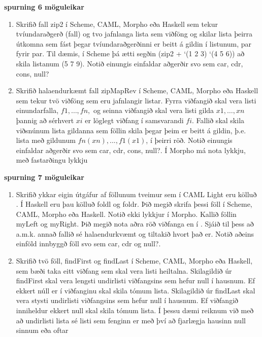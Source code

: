 \documentclass{article}
\newcommand{\bo}[1]{\textbf{#1}}
\begin{document}
\bo{spurning 6  möguleikar}
\begin{enumerate}
    \item Skrifið fall zip2 í Scheme, CAML, Morpho eða Haskell sem tekur
    tvíundaraðgerð (fall) og tvo jafnlanga lista sem viðföng og skilar
    lista þeirra útkomna sem fást þegar tvíundaraðgerðinni er beitt á
    gildin í listunum, par fyrir par. Til dæmis, í Scheme þá ætti
    segðin (zip2 + ‘(1 2 3) ‘(4 5 6)) að skila listanum (5 7 9). Notið
    einungis einfaldar aðgerðir svo sem car, cdr, cons, null?

    \item Skrifið halaendurkæmt fall zipMapRev í Scheme, CAML,
    Morpho eða Haskell sem tekur tvö viðföng sem eru jafnlangir
    listar. Fyrra viðfangið skal vera listi einundarfalla, $f1, \ldots , fn,$ og
    seinna viðfangið skal vera listi gilda $x1, \ldots , xn$ þannig að sérhvert
    $xi$ er löglegt viðfang í samsvarandi $fi$. Fallið skal skila
    viðsnúnum lista gildanna sem föllin skila þegar þeim er beitt á
    gildin, þ.e. lista með gildunum $fn(xn), ... , f1(x1)$, í þeirri röð. Notið
    einungis einfaldar aðgerðir svo sem car, cdr, cons, null?. Í
    Morpho má nota lykkju, með fastarðingu lykkju
\end{enumerate}

\bo{spurning 7 möguleikar}
\begin{enumerate}
    \item Skrifið ykkar eigin útgáfur af föllunum tveimur sem í CAML Light
    eru kölluð . Í Haskell eru þau kölluð foldl og foldr. Þið
    megið skrifa þessi föll í Scheme, CAML, Morpho eða Haskell. Notið
    ekki lykkjur í Morpho. Kallið föllin myLeft og myRight. Þið megið
    nota aðra röð viðfanga en í . Sjáið til þess að a.m.k.
    annað fallið sé halaendurkvæmt og tiltakið hvort það er. Notið
    aðeins einföld innbyggð föll svo sem car, cdr og null?.

    \item Skrifið tvö föll, findFirst og findLast í Scheme, CAML, Morpho
    eða Haskell, sem bæði taka eitt viðfang sem skal vera listi
    heiltalna. Skilagildið úr findFirst skal vera lengsti undirlisti
    viðfangsins sem hefur null í hausnum. Ef ekkert núll er í
    viðfanginu skal skila tómum lista. Skilagildið úr findLast skal
    vera stysti undirlisti viðfangsins sem hefur null í hausnum. Ef
    viðfangið inniheldur ekkert null skal skila tómum lista. Í þessu
    dæmi reiknum við með að undirlisti lista sé listi sem fenginn er
    með því að fjarlægja hausinn null sinnum eða oftar
\end{enumerate}
\newpage
\end{document}
